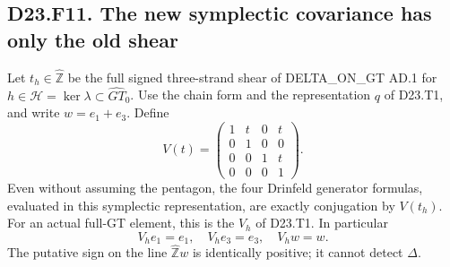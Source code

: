 
\subsection*{D23.F11. The new symplectic covariance has only the old shear}
Let $t_h\in\widehat{\mathbb Z}$ be the full signed
three-strand shear of DELTA\_ON\_GT AD.1 for
$h\in\mathcal H=\ker\lambda\subset\widehat{GT}_0$.
Use the chain form and the representation $q$ of D23.T1, and
write $w=e_1+e_3$. Define
\[
 V(t)=\begin{pmatrix}
 1&t&0&t\\0&1&0&0\\0&0&1&t\\0&0&0&1
 \end{pmatrix}.
 \tag{D23.F11.1}
\]
Even without assuming the pentagon, the four Drinfeld
generator formulas, evaluated in this symplectic representation,
are exactly conjugation by $V(t_h)$.
For an actual full-GT element, this is the $V_h$ of D23.T1.
In particular
\[
 V_he_1=e_1,\quad V_he_3=e_3,\quad V_hw=w.
\]
The putative sign on the line $\widehat{\mathbb Z}w$ is
identically positive; it cannot detect $\Delta$.

